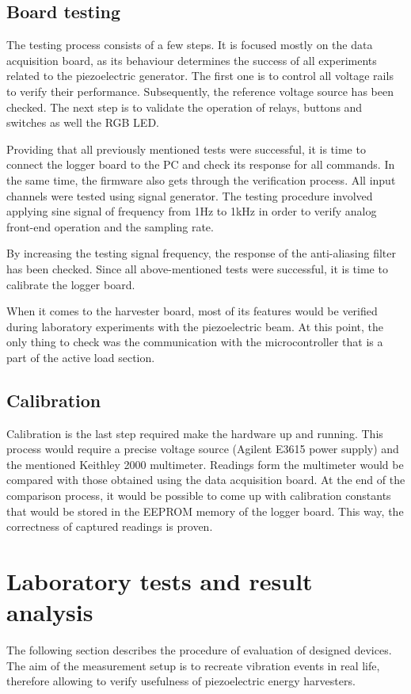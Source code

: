 \documentclass[12pt,a4paper]{article}
\begin{document}
\subsection{Board testing}
The testing process consists of a few steps. It is focused mostly on the data acquisition board, as its behaviour determines the success of all experiments related to the piezoelectric generator. The first one is to control all voltage rails to verify their performance. Subsequently, the reference voltage source has been checked. The next step is to validate the operation of relays, buttons and switches as well the RGB LED.
\par
Providing that all previously mentioned tests were successful, it is time to connect the logger board to the PC and check its response for all commands. In the same time, the firmware also gets through the verification process. All input channels were tested using signal generator. The testing procedure involved applying sine signal of frequency from 1Hz to 1kHz in order to verify analog front-end operation and the sampling rate.
\par
By increasing the testing signal frequency, the response of the anti-aliasing filter has been checked.
Since all above-mentioned tests were successful, it is time to calibrate the logger board.
\par
When it comes to the harvester board, most of its features would be verified during laboratory experiments with the piezoelectric beam. At this point, the only thing to check was the communication with the microcontroller that is a part of the active load section.
\par


\subsection{Calibration}
Calibration is the last step required make the hardware up and running. This process would require a precise voltage source (Agilent E3615 power supply) and the mentioned Keithley 2000 multimeter. Readings form the multimeter would be compared with those obtained using the data acquisition board. At the end of the comparison process, it would be possible to come up with calibration constants that would be stored in the EEPROM memory of the logger board. This way, the correctness of captured readings is proven.

\FloatBarrier

\section{Laboratory tests and result analysis}
The following section describes the procedure of evaluation of designed devices. The aim of the measurement setup is to recreate vibration events in real life, therefore allowing to verify usefulness of piezoelectric energy harvesters.
\par
\end{document}
